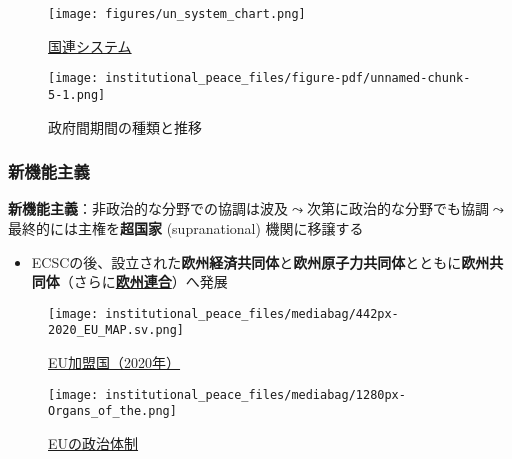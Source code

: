 \documentclass[
  xelatex,
  ja=standard]{bxjsarticle}
\providecommand{\tightlist}{%
  \setlength{\itemsep}{0pt}\setlength{\parskip}{0pt}}\usepackage{longtable,booktabs,array}
\begin{document}
\begin{figure}[htpb]

{\centering \texttt{[image: figures/un\_system\_chart.png]}

}

\caption{\href{https://www.un.org/en/about-us/un-system}{国連システム}}

\end{figure}

\begin{figure}[htpb]

{\centering \texttt{[image: institutional\_peace\_files/figure-pdf/unnamed-chunk-5-1.png]}

}

\caption{政府間期間の種類と推移}

\end{figure}

\hypertarget{ux65b0ux6a5fux80fdux4e3bux7fa9}{%
\subsubsection{新機能主義}\label{ux65b0ux6a5fux80fdux4e3bux7fa9}}

\textbf{新機能主義}：非政治的な分野での協調は波及\(\leadsto\)次第に政治的な分野でも協調\(\leadsto\)最終的には主権を\textbf{超国家}
(supranational) 機関に移譲する

\begin{itemize}
\tightlist
\item
  ECSCの後、設立された\textbf{欧州経済共同体}と\textbf{欧州原子力共同体}とともに\textbf{欧州共同体}（さらに\href{https://www.mofa.go.jp/mofaj/area/eu/index.html}{\textbf{欧州連合}}）へ発展
\end{itemize}

\begin{figure}[htpb]

{\centering \texttt{[image: institutional\_peace\_files/mediabag/442px-2020\_EU\_MAP.sv.png]}

}

\caption{\href{https://commons.wikimedia.org/wiki/File:2020_EU_MAP.svg}{EU加盟国（2020年）}}

\end{figure}

\begin{figure}[htpb]

{\centering \texttt{[image: institutional\_peace\_files/mediabag/1280px-Organs\_of\_the.png]}

}

\caption{\href{https://commons.wikimedia.org/wiki/File:Organs_of_the_European_Union.svg}{EUの政治体制}}

\end{figure}
\end{document}
